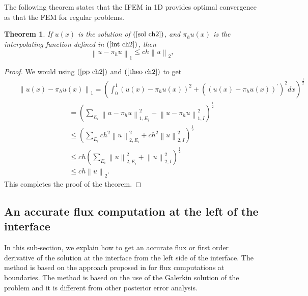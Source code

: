 \documentclass[11pt]{article}
\numberwithin{equation}{section}
\newtheorem{theorem}{Theorem}[section]
\begin{document}
The following theorem states that the IFEM in 1D provides optimal convergence as that the FEM for regular problems.
\begin{theorem}{}
If $u\left(x\right)$ is the solution of $\left(\ref{sol ch2}\right)$,
and $\pi_{h}u\left(x\right)$ is the interpolating function defined in $\left(\ref{int ch2}\right)$, then
\begin{equation}\label{error ch2}
\left\|u-\pi_{h} u\right\|_{1}\leq ch\left\|u\right\|_{2},
\end{equation}
\end{theorem}
\begin{proof}
We would using $\left(\ref{pp ch2}\right)$ and $\left(\ref{theo ch2}\right)$ to get
\begin{eqnarray*}
&&\left\|u\left(x\right)-\pi_{h} u\left(x\right)\right\|_{1}=\left(\int_{0}^{1}\left(u\left(x\right)-\pi_{h} u\left(x\right)\right)^{2}+\left(\left(u\left(x\right)-\pi_{h} u\left(x\right)\right)^{'}\right)^{2}dx\right)^{\frac{1}{2}}\\
&&\qquad\qquad\qquad~~~~~=\left(\sum_{E_{i}}\left\|u-\pi_{h} u\right\|_{1, E_{i}}^{2}+\left\|u-\pi_{h} u\right\|_{1, I}^{2}\right)^{\frac{1}{2}}\\
&&\qquad\qquad\qquad~~~~~\leq \left(\sum_{E_{i}} ch^{2}\left\|u\right\|_{2, E_{i}}^{2}+ch^{2}\left\|u\right\|_{2, I}^{2}\right)^{\frac{1}{2}}\\
&&\qquad\qquad\qquad~~~~~\leq ch\left(\sum_{E_{i}}\left\|u\right\|_{2, E_{i}}^{2}+\left\|u\right\|_{2, I}^{2}\right)^{\frac{1}{2}} \\
&&~~~\qquad\qquad\qquad~~\leq ch\left\|u\right\|_{2}.
\end{eqnarray*}
This completes the proof of the theorem.
\end{proof}





\subsection{An accurate flux computation at the left of the interface}

In this sub-section, we explain how to get an accurate flux or
first order derivative of the solution at the interface from the left side of the interface.
The method is based on the approach proposed in \cite{wheeler1974galerkin}
for flux computations at boundaries.
The method is based on the use of the Galerkin solution of the problem
and it is different from other posterior error analysis.
\end{document}
